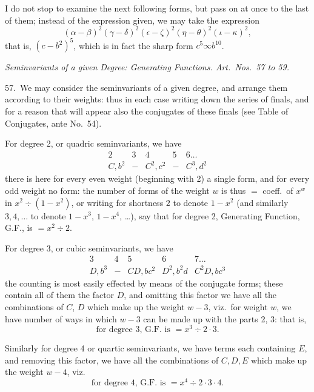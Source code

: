 \documentclass[11pt]{article}
\begin{document}
I do not stop to examine the next following forms, but pass on at once to the last of them; instead of the expression given, we may take the expression
\[
(\alpha - \beta)^2 (\gamma - \delta)^2 (\epsilon - \zeta)^2 (\eta - \theta)^2 (\iota - \kappa)^2,
\]
that is, $(c - b^2)^5$, which is in fact the sharp form $c^5 \infty b^{10}$.

\medskip
\begin{center}
\textit{Seminvariants of a given Degree: Generating Functions. Art.\ Nos.\ 57 to 59.}
\end{center}

57.\ We may consider the seminvariants of a given degree, and arrange them according to their weights: thus in each case writing down the series of finals, and for a reason that will appear also the conjugates of these finals (see Table of Conjugates, ante No.\ 54).

For degree 2, or quadric seminvariants, we have
\[
\begin{array}{ccccc}
2 & 3 & 4 & 5 & 6 \ldots \\
\hline
C, b^2 & - & C^2, c^2 & - & C^3, d^2
\end{array}
\]
there is here for every even weight (beginning with 2) a single form, and for every odd weight no form: the number of forms of the weight $w$ is thus $= $ coeff.\ of $x^w$ in $x^2 \div (1 - x^2)$, or writing for shortness $2$ to denote $1 - x^2$ (and similarly $3, 4, \ldots$ to denote $1 - x^3$, $1 - x^4$, \ldots), say that for degree 2, Generating Function, G.F., is $= x^2 \div 2$.

For degree 3, or cubic seminvariants, we have
\[
\begin{array}{ccccc}
3 & 4 & 5 & 6 & 7 \ldots \\
\hline
D, b^3 & - & CD, bc^2 & D^2, b^2d & C^2D, bc^3
\end{array}
\]
the counting is most easily effected by means of the conjugate forms; these contain all of them the factor $D$, and omitting this factor we have all the combinations of $C$, $D$ which make up the weight $w - 3$, viz.\ for weight $w$, we have number of ways in which $w - 3$ can be made up with the parts 2, 3: that is,
\[
\text{for degree 3, G.F.\ is } = x^3 \div 2 \cdot 3.
\]

Similarly for degree 4 or quartic seminvariants, we have terms each containing $E$, and removing this factor, we have all the combinations of $C, D, E$ which make up the weight $w - 4$, viz.
\[
\text{for degree 4, G.F.\ is } = x^4 \div 2 \cdot 3 \cdot 4.
\]
\end{document}
